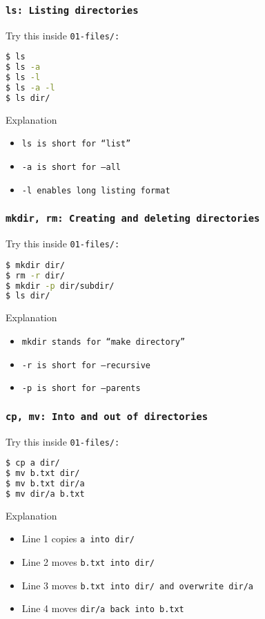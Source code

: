 \begin{frame}[fragile]
\frametitle{\tt{ls}: Listing directories}
Try this inside \tt{01-files/}:
\begin{lstlisting}[language=bash]
$ ls
$ ls -a
$ ls -l
$ ls -a -l
$ ls dir/
\end{lstlisting}
\begin{block}{Explanation}
    \begin{itemize}
        \item \tt{ls} is short for ``list''
        \item \tt{-a} is short for \tt{--all}
        \item \tt{-l} enables long listing format
    \end{itemize}
\end{block}
\end{frame}

\begin{frame}[fragile]
\frametitle{\tt{mkdir, rm}: Creating and deleting directories}
Try this inside \tt{01-files/}:
\begin{lstlisting}[language=bash]
$ mkdir dir/
$ rm -r dir/
$ mkdir -p dir/subdir/
$ ls dir/
\end{lstlisting}
\begin{block}{Explanation}
    \begin{itemize}
        \item \tt{mkdir} stands for ``make directory''
        \item \tt{-r} is short for \tt{--recursive}
        \item \tt{-p} is short for \tt{--parents}
    \end{itemize}
\end{block}
\end{frame}

\begin{frame}[fragile]
\frametitle{\tt{cp, mv}: Into and out of directories}
Try this inside \tt{01-files/}:
\begin{lstlisting}[language=bash]
$ cp a dir/
$ mv b.txt dir/
$ mv b.txt dir/a
$ mv dir/a b.txt
\end{lstlisting}
\begin{block}{Explanation}
    \begin{itemize}
        \item Line 1 copies \tt{a} into \tt{dir/}
        \item Line 2 moves \tt{b.txt} into \tt{dir/}
        \item Line 3 moves \tt{b.txt} into \tt{dir/} and overwrite \tt{dir/a}
        \item Line 4 moves \tt{dir/a} back into \tt{b.txt}
    \end{itemize}
\end{block}
\end{frame}

